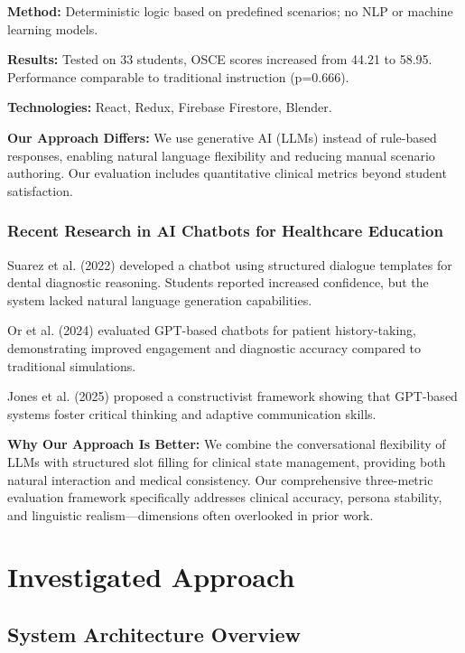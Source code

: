 \documentclass[runningheads,a4paper,11pt]{report}
\begin{document}
\textbf{Method:} Deterministic logic based on predefined scenarios; no NLP or machine learning models.

\textbf{Results:} Tested on 33 students, OSCE scores increased from 44.21 to 58.95. Performance comparable to traditional instruction (p=0.666).

\textbf{Technologies:} React, Redux, Firebase Firestore, Blender.

\textbf{Our Approach Differs:} We use generative AI (LLMs) instead of rule-based responses, enabling natural language flexibility and reducing manual scenario authoring. Our evaluation includes quantitative clinical metrics beyond student satisfaction.

\subsection{Recent Research in AI Chatbots for Healthcare Education}

Suarez et al. (2022) \cite{suarez2022} developed a chatbot using structured dialogue templates for dental diagnostic reasoning. Students reported increased confidence, but the system lacked natural language generation capabilities.

Or et al. (2024) \cite{or2024} evaluated GPT-based chatbots for patient history-taking, demonstrating improved engagement and diagnostic accuracy compared to traditional simulations.

Jones et al. (2025) \cite{jones2025} proposed a constructivist framework showing that GPT-based systems foster critical thinking and adaptive communication skills.

\textbf{Why Our Approach Is Better:} We combine the conversational flexibility of LLMs with structured slot filling for clinical state management, providing both natural interaction and medical consistency. Our comprehensive three-metric evaluation framework specifically addresses clinical accuracy, persona stability, and linguistic realism—dimensions often overlooked in prior work.

\chapter{Investigated Approach}
\label{chapter:proposedApproach}

\section{System Architecture Overview}
\end{document}
